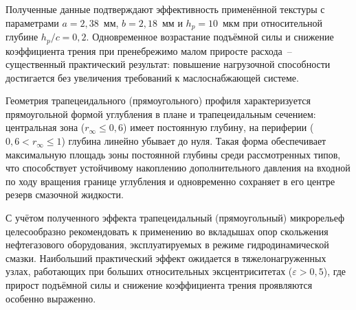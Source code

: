Полученные данные подтверждают эффективность применённой текстуры с параметрами $a = 2{,}38$~мм, $b = 2{,}18$~мм и $h_p = 10$~мкм при относительной глубине $h_p/c = 0{,}2$. Одновременное возрастание подъёмной силы и снижение коэффициента трения при пренебрежимо малом приросте расхода~-- существенный практический результат: повышение нагрузочной способности достигается без увеличения требований к маслоснабжающей системе.

Геометрия трапецеидального (прямоугольного) профиля характеризуется прямоугольной формой углубления в плане и трапецеидальным сечением: центральная зона ($r_\infty \leq 0{,}6$) имеет постоянную глубину, на периферии ($0{,}6 < r_\infty \leq 1$) глубина линейно убывает до нуля. Такая форма обеспечивает максимальную площадь зоны постоянной глубины среди рассмотренных типов, что способствует устойчивому накоплению дополнительного давления на входной по ходу вращения границе углубления и одновременно сохраняет в его центре резерв смазочной жидкости.

С учётом полученного эффекта трапецеидальный (прямоугольный) микрорельеф целесообразно рекомендовать к применению во вкладышах опор скольжения нефтегазового оборудования, эксплуатируемых в режиме гидродинамической смазки. Наибольший практический эффект ожидается в тяжелонагруженных узлах, работающих при больших относительных эксцентриситетах ($\varepsilon > 0{,}5$), где прирост подъёмной силы и снижение коэффициента трения проявляются особенно выраженно.

